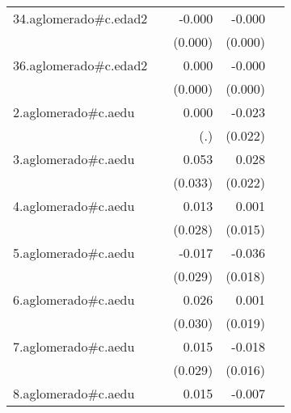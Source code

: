 {\begin{longtable}{l*{4}{D{.}{.}{-1}}}
\addlinespace
34.aglomerado#c.edad2&                     &      -0.000         &      -0.000\sym{***}&                     \\
            &                     &     (0.000)         &     (0.000)         &                     \\
\addlinespace
36.aglomerado#c.edad2&                     &       0.000         &      -0.000         &                     \\
            &                     &     (0.000)         &     (0.000)         &                     \\
\addlinespace
2.aglomerado#c.aedu&                     &       0.000         &      -0.023         &                     \\
            &                     &         (.)         &     (0.022)         &                     \\
\addlinespace
3.aglomerado#c.aedu&                     &       0.053         &       0.028         &                     \\
            &                     &     (0.033)         &     (0.022)         &                     \\
\addlinespace
4.aglomerado#c.aedu&                     &       0.013         &       0.001         &                     \\
            &                     &     (0.028)         &     (0.015)         &                     \\
\addlinespace
5.aglomerado#c.aedu&                     &      -0.017         &      -0.036         &                     \\
            &                     &     (0.029)         &     (0.018)         &                     \\
\addlinespace
6.aglomerado#c.aedu&                     &       0.026         &       0.001         &                     \\
            &                     &     (0.030)         &     (0.019)         &                     \\
\addlinespace
7.aglomerado#c.aedu&                     &       0.015         &      -0.018         &                     \\
            &                     &     (0.029)         &     (0.016)         &                     \\
\addlinespace
8.aglomerado#c.aedu&                     &       0.015         &      -0.007         &                     \\

\end{longtable}}
